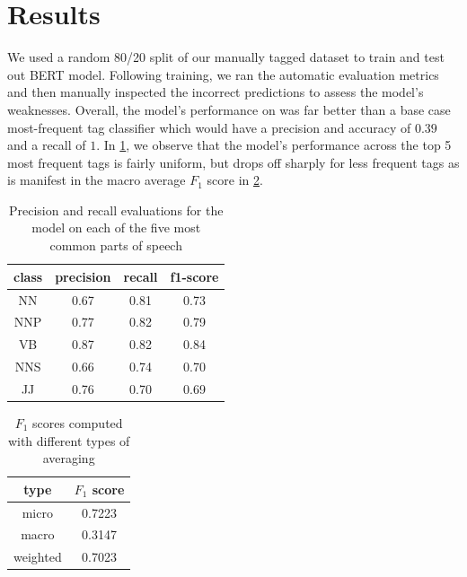 \documentclass[11pt]{article}
\begin{document}
\section{Results}
We used a random 80/20 split of our manually tagged dataset to train and test out BERT model. Following training, we ran the automatic evaluation metrics and then manually inspected the incorrect predictions to assess the model's weaknesses. Overall, the model's performance on was far better than a base case most-frequent tag classifier which would have a precision and accuracy of $0.39$ and a recall of $1$. In \ref{tab:precisions_recalls}, we observe that the model's performance across the top 5 most frequent tags is fairly uniform, but drops off sharply for less frequent tags as is manifest in the macro average $F_1$ score in \ref{tab:f1_scores}.
\begin{table}[h]
    \centering
    \begin{tabular}{c|ccc}
        class & precision & recall & f1-score\\
        \hline
        NN & 0.67 & 0.81 & 0.73 \\
        NNP & 0.77 & 0.82 & 0.79 \\
        VB & 0.87 & 0.82 & 0.84 \\ 
        NNS & 0.66 & 0.74 & 0.70 \\
        JJ & 0.76 & 0.70 & 0.69
    \end{tabular}
    \caption{Precision and recall evaluations for the model on each of the five most common parts of speech}
    \label{tab:precisions_recalls}
\end{table}
\begin{table}[h]
    \centering
    \begin{tabular}{c|c}
        type & $F_1$ score \\
        \hline
        micro & 0.7223 \\
        macro & 0.3147 \\
        weighted & 0.7023
    \end{tabular}
    \caption{$F_1$ scores computed with different types of averaging}
    \label{tab:f1_scores}
\end{table}
\end{document}
